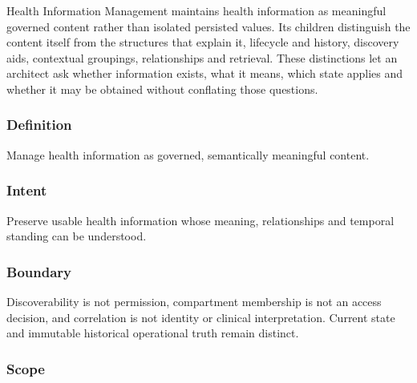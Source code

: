Health Information Management maintains health information as meaningful governed content rather than isolated persisted values. Its children distinguish the content itself from the structures that explain it, lifecycle and history, discovery aids, contextual groupings, relationships and retrieval. These distinctions let an architect ask whether information exists, what it means, which state applies and whether it may be obtained without conflating those questions.

\subsubsection*{Definition}

Manage health information as governed, semantically meaningful content.

\subsubsection*{Intent}

Preserve usable health information whose meaning, relationships and temporal standing can be understood.

\subsubsection*{Boundary}

Discoverability is not permission, compartment membership is not an access decision, and correlation is not identity or clinical interpretation. Current state and immutable historical operational truth remain distinct.

\subsubsection*{Scope}
